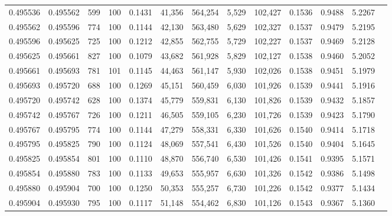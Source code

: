 \begin{tabular}{rrrrrrrrrrrrr}
0.495536 & 0.495562 &   599 & 100 &                                     0.1431 &  41,356 & 564,254 &   5,529 & 102,427 & 0.1536 & 0.9488 & 5.2267 \\
0.495562 & 0.495596 &   774 & 100 &                                     0.1144 &  42,130 & 563,480 &   5,629 & 102,327 & 0.1537 & 0.9479 & 5.2195 \\
0.495596 & 0.495625 &   725 & 100 &                                     0.1212 &  42,855 & 562,755 &   5,729 & 102,227 & 0.1537 & 0.9469 & 5.2128 \\
0.495625 & 0.495661 &   827 & 100 &                                     0.1079 &  43,682 & 561,928 &   5,829 & 102,127 & 0.1538 & 0.9460 & 5.2052 \\
0.495661 & 0.495693 &   781 & 101 &                                     0.1145 &  44,463 & 561,147 &   5,930 & 102,026 & 0.1538 & 0.9451 & 5.1979 \\
0.495693 & 0.495720 &   688 & 100 &                                     0.1269 &  45,151 & 560,459 &   6,030 & 101,926 & 0.1539 & 0.9441 & 5.1916 \\
0.495720 & 0.495742 &   628 & 100 &                                     0.1374 &  45,779 & 559,831 &   6,130 & 101,826 & 0.1539 & 0.9432 & 5.1857 \\
0.495742 & 0.495767 &   726 & 100 &                                     0.1211 &  46,505 & 559,105 &   6,230 & 101,726 & 0.1539 & 0.9423 & 5.1790 \\
0.495767 & 0.495795 &   774 & 100 &                                     0.1144 &  47,279 & 558,331 &   6,330 & 101,626 & 0.1540 & 0.9414 & 5.1718 \\
0.495795 & 0.495825 &   790 & 100 &                                     0.1124 &  48,069 & 557,541 &   6,430 & 101,526 & 0.1540 & 0.9404 & 5.1645 \\
0.495825 & 0.495854 &   801 & 100 &                                     0.1110 &  48,870 & 556,740 &   6,530 & 101,426 & 0.1541 & 0.9395 & 5.1571 \\
0.495854 & 0.495880 &   783 & 100 &                                     0.1133 &  49,653 & 555,957 &   6,630 & 101,326 & 0.1542 & 0.9386 & 5.1498 \\
0.495880 & 0.495904 &   700 & 100 &                                     0.1250 &  50,353 & 555,257 &   6,730 & 101,226 & 0.1542 & 0.9377 & 5.1434 \\
0.495904 & 0.495930 &   795 & 100 &                                     0.1117 &  51,148 & 554,462 &   6,830 & 101,126 & 0.1543 & 0.9367 & 5.1360 \\

\end{tabular}

